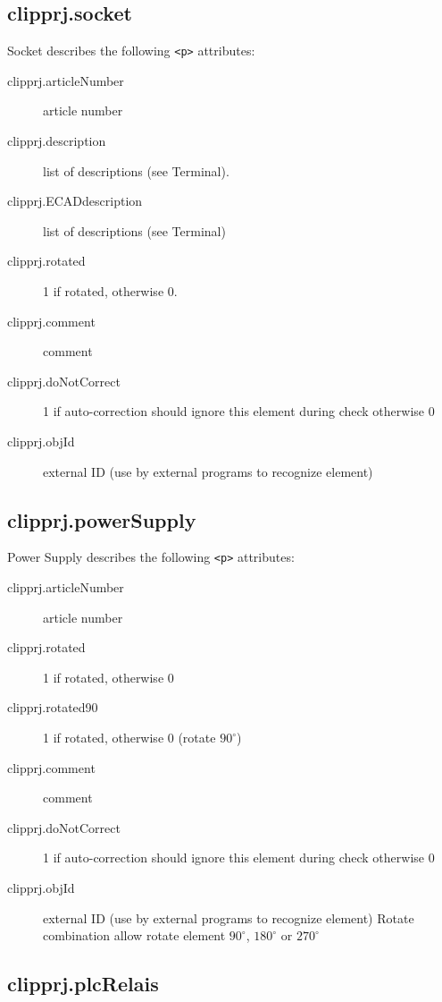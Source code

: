 \documentclass[%
	a4paper,
	oneside,
	listof=numbered,
	parskip=half,
	headsepline=true,
	footsepline=false,
	normalheadings,
	0.7headlines,
	headexclude,
	]{scrbook}
\begin{document}
\subsection{clipprj.socket}
 
Socket describes the following \verb|<p>| attributes: 

\begin{description}
	\item[clipprj.articleNumber] article number 
	\item[clipprj.description] list of descriptions (see Terminal). 
	\item[ clipprj.ECADdescription] list of descriptions (see Terminal) 
	\item[clipprj.rotated] 1 if rotated, otherwise 0. 
	\item[clipprj.comment] comment 
	\item[clipprj.doNotCorrect] 1 if auto-correction should ignore this element during check otherwise 0 
	\item[clipprj.objId] external ID (use by external programs to recognize element) 
\end{description}

\subsection{clipprj.powerSupply}
 
Power Supply describes the following \verb|<p>| attributes: 

\begin{description}
	\item[clipprj.articleNumber] article number
	\item[clipprj.rotated] 1 if rotated, otherwise 0
	\item[clipprj.rotated90] 1 if rotated, otherwise 0 (rotate $90^\circ$) 
	\item[clipprj.comment] comment
	\item[clipprj.doNotCorrect] 1 if auto-correction should ignore this element during check otherwise 0
	\item[clipprj.objId] external ID (use by external programs to recognize element) Rotate combination allow rotate element $90^\circ$, $180^\circ$ or $270^\circ$
\end{description}

\subsection{clipprj.plcRelais}
 
\end{document}
